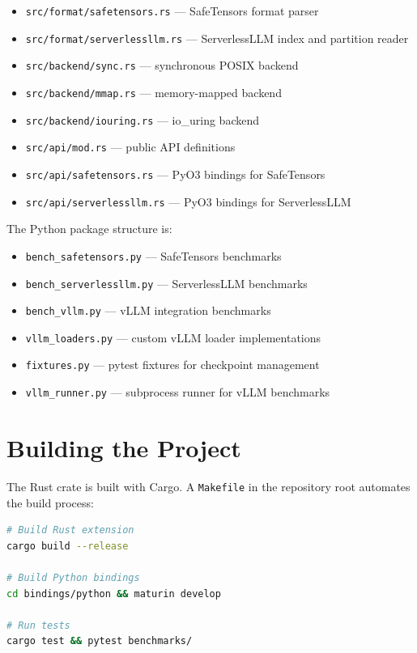 \begin{itemize}
\item \texttt{src/format/safetensors.rs} --- SafeTensors format parser
\item \texttt{src/format/serverlessllm.rs} --- ServerlessLLM index and partition reader
\item \texttt{src/backend/sync.rs} --- synchronous POSIX backend
\item \texttt{src/backend/mmap.rs} --- memory-mapped backend
\item \texttt{src/backend/iouring.rs} --- io\_uring backend
\item \texttt{src/api/mod.rs} --- public API definitions
\item \texttt{src/api/safetensors.rs} --- PyO3 bindings for SafeTensors
\item \texttt{src/api/serverlessllm.rs} --- PyO3 bindings for ServerlessLLM
\end{itemize}

The Python package structure is:

\begin{itemize}
\item \texttt{bench\_safetensors.py} --- SafeTensors benchmarks
\item \texttt{bench\_serverlessllm.py} --- ServerlessLLM benchmarks
\item \texttt{bench\_vllm.py} --- vLLM integration benchmarks
\item \texttt{vllm\_loaders.py} --- custom vLLM loader implementations
\item \texttt{fixtures.py} --- pytest fixtures for checkpoint management
\item \texttt{vllm\_runner.py} --- subprocess runner for vLLM benchmarks
\end{itemize}

\section{Building the Project}

The Rust crate is built with Cargo. A \texttt{Makefile} in the repository root automates the build process:

\begin{lstlisting}[language=bash, numbers=none]
# Build Rust extension
cargo build --release

# Build Python bindings
cd bindings/python && maturin develop

# Run tests
cargo test && pytest benchmarks/
\end{lstlisting}

